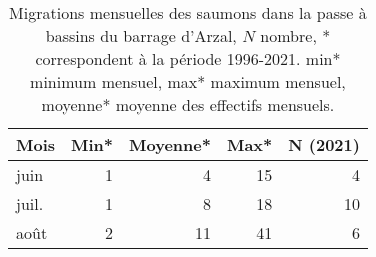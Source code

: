 \begin{table}[htbp]
\centering
\begin{tabular}{lrrrr}
  \hline
Mois & Min* & Moyenne* & Max* & N (2021) \\ 
  \hline
juin & 1 & 4 & 15 & 4 \\ 
  juil. & 1 & 8 & 18 & 10 \\ 
  août & 2 & 11 & 41 & 6 \\ 
   \hline
\end{tabular}
\caption{Migrations mensuelles des saumons dans la passe à bassins du barrage d'Arzal, $N$ nombre, * correspondent à
				la période 1996-2021. min* minimum mensuel, max* maximum mensuel, moyenne* moyenne des effectifs mensuels.} 
\label{table_sat_mois}
\end{table}
